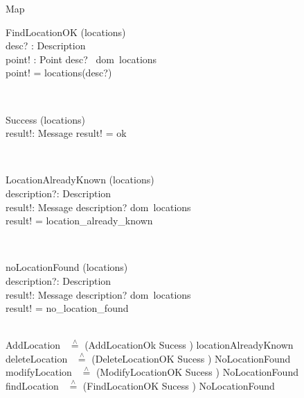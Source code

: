 \documentclass[12pt]{article}
\begin{document}
\begin{spacing}{1.5}
\begin{class}{Map}
\begin{op}{FindLocationOK}
\Xi (locations) \\
desc? : Description\\
point! : Point
\ST
desc? \in ~dom~locations \\
point! = locations(desc?)
\end{op}\\
\begin{op}{Success}
\Xi (locations) \\
result!: Message
\ST
result! = ok
\end{op}\\
\zbreak
\begin{op}{LocationAlreadyKnown}
\Xi (locations) \\
description?: Description \\
result!: Message
\ST
description? \in dom~locations \\
result! = location\_already\_known
\end{op}\\
\begin{op}{noLocationFound}
\Xi (locations) \\
description?: Description \\
result!: Message
\ST
description? \notin dom~locations \\
result! = no\_location\_found
\end{op}\\
AddLocation ~$\stackrel{\wedge}{=}$ (AddLocationOk \land Sucess ) \lor locationAlreadyKnown
\\
deleteLocation ~$\stackrel{\wedge}{=}$ (DeleteLocationOK \land Sucess ) \lor NoLocationFound
\\
modifyLocation ~$\stackrel{\wedge}{=}$ (ModifyLocationOK \land Sucess ) \lor NoLocationFound
\\
findLocation ~$\stackrel{\wedge}{=}$ (FindLocationOK \land Sucess ) \lor NoLocationFound
\end{class}
\znewpage


\end{spacing}
\end{document}
